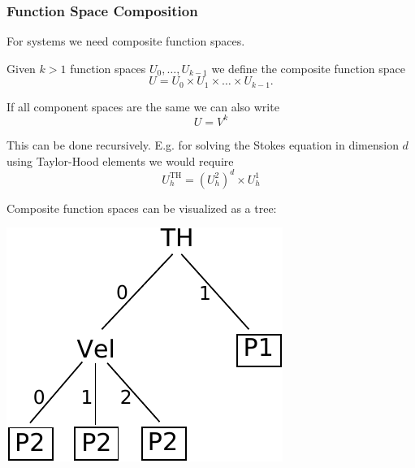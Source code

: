 \begin{frame}
\frametitle<presentation>{Function Space Composition}
For systems we need composite function spaces.

Given $k>1$ function spaces $U_0, \ldots, U_{k-1}$ we define the
composite function space 
\begin{equation}
U = U_0 \times U_1 \times \ldots \times U_{k-1} .
\end{equation}

If all component spaces are the same we can also write
\begin{equation}
U = V^k
\end{equation}

This can be done recursively. E.g. for solving the Stokes equation
in dimension $d$ using Taylor-Hood elements we would require
\begin{equation*}
U_h^\text{TH} = \left( U_h^2\right)^d \times U_h^1
\end{equation*}

Composite function spaces can be visualized as a tree:
\begin{minipage}[c]{0.2\textwidth}
\includegraphics[width=\textwidth]{./EPS/THBaum}
\end{minipage}

\end{frame}

\cleardoublepage

